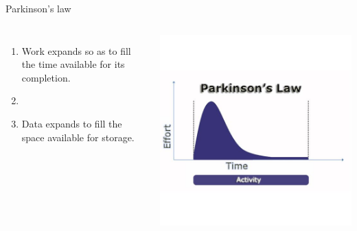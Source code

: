 \documentclass[xcolor=svgnames]{beamer}
\begin{document}
\begin{CJK*}{UTF8}{gbsn}
\begin{frame}{Parkinson's law}
\begin{columns}%
\begin{enumerate}
\item Work expands so as to fill the time available for its completion.
\item[]
\item Data expands to fill the space available for storage.
\end{enumerate}
\includegraphics[width=1.0\textwidth]{parkinson.jpg}
\end{columns}%
\end{frame}


\end{CJK*}
\end{document}
